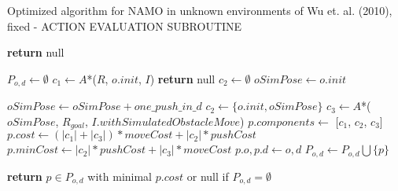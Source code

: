 \begin{algorithm}[H]

  \caption{Optimized algorithm for NAMO in unknown environments of Wu et. al. (2010), fixed - ACTION EVALUATION SUBROUTINE}

  \label{alg:01-wu-optevaluateaction}

  \begin{algorithmic}[1]


        \State \textbf{return} null
      \EndIf

      \State $P_{o,d} \gets \emptyset$
      \State $c_{1} \gets A$*($R$, $o.init$, $I$) 
       
        \State \textbf{return} null
      \EndIf
      \State $c_{2} \gets \emptyset$
      \State $oSimPose \gets o.init$

       
        \State $oSimPose \gets oSimPose + one\_push\_in\_d$ 
         
          \State $c_{2} \gets \{o.init, oSimPose\}$ 
          \State $c_{3} \gets A$*($oSimPose$, $R_{goal}$, $I.withSimulatedObstacleMove$) 
           
            \State $p.components \gets$ [$c_{1}$, $c_{2}$, $c_{3}$]
            \State $p.cost \gets (|c_{1}| + |c_{3}|) * moveCost + |c_{2}| * pushCost$
            \State $p.minCost \gets |c_{2}| * pushCost + |c_{3}| * moveCost$
            \State $p.o, p.d \gets o, d$
            \State $P_{o,d} \gets P_{o,d} \bigcup \{p\}$
          \EndIf
        \EndIf
      \EndWhile

      \State \textbf{return} $p \in P_{o,d}$ with minimal $p.cost$ or null if $P_{o,d} = \emptyset$

    \EndProcedure

  \end{algorithmic}

\end{algorithm}
